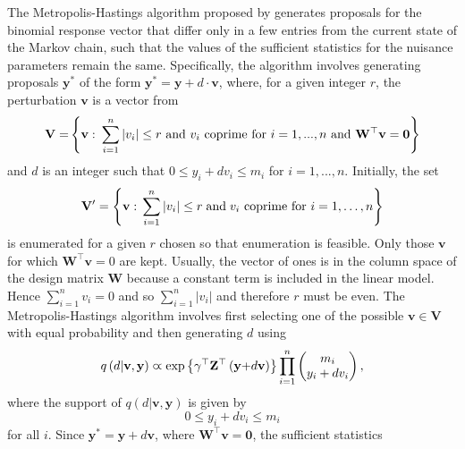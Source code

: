 \documentclass[article, shortnames]{jss}
\begin{document}
The Metropolis-Hastings algorithm proposed by \citet{Forster:2003}
generates proposals
for the binomial response vector that differ only in a few entries
from the current state of the
Markov chain, such that the values of the sufficient statistics for
the nuisance parameters remain the same.
Specifically, the algorithm
involves generating proposals $\mathbf{y}^{\ast }$ of the form
$\mathbf{y}^{\ast }=\mathbf{y} +d\cdot \mathbf{v}$,
where, for a given integer $r$, the perturbation $\mathbf{v}$ is a vector from
$$
\mathbf{V=}\left\{ \mathbf{v:}\text{ }\sum_{i=1}^{n}\left\vert
v_{i}\right\vert \leq r\text{ \textrm{and }}v_{i}\text{
\textrm{coprime for} }i=1,...,n\text{ and
}\mathbf{W}^\top\mathbf{v=0}\right\}
$$
and $d$ is an integer such that $0\leq y_{i}+dv_{i}\leq m_{i}$
for $i=1,...,n$.
Initially, the set
$$
\mathbf{V}'=\left\{ \mathbf{v:} \; \sum_{i=1}^{n} |v_{i}|
\leq r \; {\rm and} \; v_{i}
\mbox{ coprime for } i=1,\ldots ,n
\right\}
$$
is enumerated for a given $r$ chosen so that enumeration is feasible.
Only those $\mathbf{v}$ for which $\mathbf{W}^\top \mathbf{v} = 0$ are kept.
Usually, the vector of ones is in the column space of the design
matrix $\mathbf{W}$ because a constant term is included in the linear
model. Hence $\sum\limits_{i=1}^{n}v_{i}=0$ and so
$\sum\limits_{i=1}^{n}\left\vert v_{i}\right\vert$
and therefore $r$ must be even.
The Metropolis-Hastings algorithm involves first selecting one of the
possible $\mathbf{v}\in \mathbf{V}$ with equal probability and then generating $d$
using
$$
q\left( d|\mathbf{v},\mathbf{y}\right) \varpropto \exp \left\{ \mathbf{%
\gamma }^\top\mathbf{Z}^\top\left( \mathbf{y+}d\mathbf{v}\right) \right\}
\prod\limits_{i=1}^{n}%
\begin{pmatrix}
m_{i} \\
y_{i}+dv_{i}%
\end{pmatrix}%
,
$$
where the support of $q\left( d|\mathbf{v},\mathbf{y}\right) $ is given by
\begin{equation}
0\leq y_{i}+dv_{i}\leq m_{i}  \label{constraint on y +dv}
\end{equation}%
for all $i$. Since $\mathbf{y}^{\ast }=\mathbf{y}+d\mathbf{v}$, where
$\mathbf{W}^\top\mathbf{v}=\mathbf{0}$, the sufficient statistics
\end{document}
